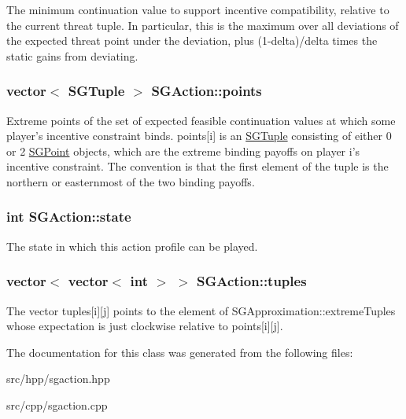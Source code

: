 The minimum continuation value to support incentive compatibility, relative to the current threat tuple. In particular, this is the maximum over all deviations of the expected threat point under the deviation, plus (1-\/delta)/delta times the static gains from deviating. \hypertarget{classSGAction_a8860ada2cacece1a8feed794d81d9e9f}{
\subsubsection[{points}]{\setlength{\rightskip}{0pt plus 5cm}vector$<$ {\bf S\-G\-Tuple} $>$ S\-G\-Action\-::points\hspace{0.3cm}{\ttfamily [protected]}}}\label{classSGAction_a8860ada2cacece1a8feed794d81d9e9f}
Extreme points of the set of expected feasible continuation values at which some player's incentive constraint binds. points\mbox{[}i\mbox{]} is an \hyperlink{classSGTuple}{S\-G\-Tuple} consisting of either 0 or 2 \hyperlink{classSGPoint}{S\-G\-Point} objects, which are the extreme binding payoffs on player i's incentive constraint. The convention is that the first element of the tuple is the northern or easternmost of the two binding payoffs. \hypertarget{classSGAction_a1ad4ae3feb4e3ec46e21273dd51a6004}{
\subsubsection[{state}]{\setlength{\rightskip}{0pt plus 5cm}int S\-G\-Action\-::state\hspace{0.3cm}{\ttfamily [protected]}}}\label{classSGAction_a1ad4ae3feb4e3ec46e21273dd51a6004}
The state in which this action profile can be played. \hypertarget{classSGAction_a60599bc5a745db1557191a61c0db28b3}{
\subsubsection[{tuples}]{\setlength{\rightskip}{0pt plus 5cm}vector$<$ vector$<$ int $>$ $>$ S\-G\-Action\-::tuples\hspace{0.3cm}{\ttfamily [protected]}}}\label{classSGAction_a60599bc5a745db1557191a61c0db28b3}
The vector tuples\mbox{[}i\mbox{]}\mbox{[}j\mbox{]} points to the element of S\-G\-Approximation\-::extreme\-Tuples whose expectation is just clockwise relative to points\mbox{[}i\mbox{]}\mbox{[}j\mbox{]}. 

The documentation for this class was generated from the following files\-:\begin{DoxyCompactItemize}
\item 
src/hpp/sgaction.\-hpp\item 
src/cpp/sgaction.\-cpp\end{DoxyCompactItemize}
